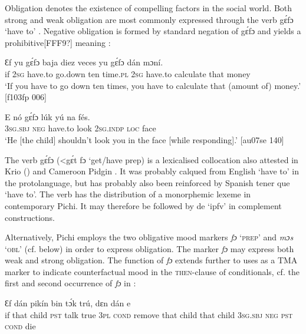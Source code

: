 Obligation denotes the existence of compelling factors in the social world. Both strong and weak obligation are most commonly expressed through the verb gɛ́fɔ ‘have to’ . Negative obligation is formed by standard negation of gɛ́fɔ and yields a prohibitive[FFF9?] meaning : 


\ea%
    \label{ex:key:414}
    \gll Ɛf  yu  gɛ́fɔ    baja    diez  veces  yu  gɛ́fɔ
    dán  mɔní.\\
if  \textsc{2sg}  have.to  go.down  ten  time.\textsc{pl}  \textsc{2sg}  have.to  
calculate    that  money\\

\glt ‘If you have to go down ten times, you have to calculate that 
(amount of) money.’ [f103fp 006]
\z


\ea%
    \label{ex:key:415}
    \gll E    nó  gɛ́fɔ    lúk    yú    na  fés.\\
\textsc{3sg.sbj}  \textsc{neg}  have.to  look    \textsc{2sg.indp}  \textsc{loc}  face\\

\glt ‘He [the child] shouldn’t look you in the face [while responding].’ [au07se 140]
\z

The verb gɛ́fɔ (<gɛ́t fɔ ‘get/have prep) is a lexicalised collocation also attested in Krio (\citealt{FyleJones1980}) and Cameroon Pidgin \citep{Nkengasong2016}. It was probably calqued from English ‘have to’ in the protolanguage, but has probably also been reinforced by Spanish tener que ‘have to’. The verb has the distribution of a monorphemic lexeme in contemporary Pichi. It may therefore be followed by de ‘ipfv’ in complement constructions. 


Alternatively, Pichi employs the two obligative mood markers \textit{fɔ} ‘\textsc{prep}’  and \textit{mɔs} ‘\textsc{obl}’ (cf.  below) in order to express obligation. The marker \textit{fɔ} may express both weak and strong obligation. The function of \textit{fɔ} extends further to uses as a TMA marker to indicate counterfactual mood in the \textsc{then-}clause of conditionals, cf. the first and second occurrence of \textit{fɔ} in :



\ea%
    \label{ex:key:416}
\gll
Ɛf  dán    pikín  bin  tɔ́k  trú,    dɛn         dán  
  e  \textstylePichiexamplenumberZchnZchn{}     \\
if  that    child  \textsc{pst}  talk  true    \textsc{3pl}  \textsc{cond}    remove  that child 
that    child  \textsc{3sg.sbj}  \textsc{neg}  \textsc{pst}  \textsc{cond}    die\\

